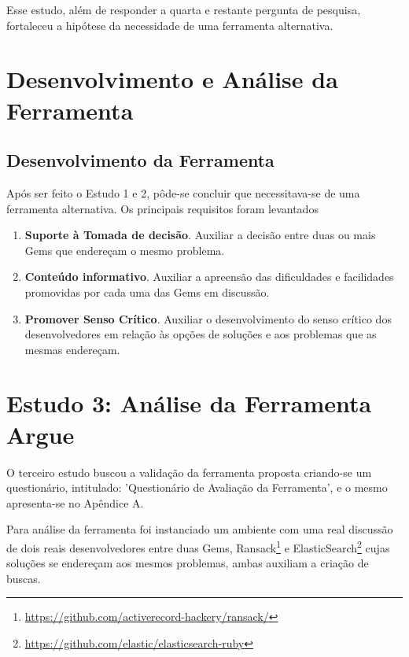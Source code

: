 Esse estudo, além de responder a quarta e restante pergunta de pesquisa, fortaleceu a hipótese da necessidade de uma ferramenta alternativa.

\section{Desenvolvimento e Análise da Ferramenta}

\subsection{Desenvolvimento da Ferramenta}

Após ser feito o Estudo 1 e 2, pôde-se concluir que necessitava-se de uma ferramenta alternativa. Os principais requisitos foram levantados

\begin{enumerate}

  \item \textbf{Suporte à Tomada de decisão}. Auxiliar a decisão entre duas ou mais Gems que endereçam o mesmo problema.
  
  \item \textbf{Conteúdo informativo}. Auxiliar a apreensão das dificuldades e facilidades promovidas por cada uma das Gems em discussão.
  
  \item \textbf{Promover Senso Crítico}. Auxiliar o desenvolvimento do senso crítico dos desenvolvedores em relação às opções de soluções e aos problemas que as mesmas endereçam.
  
\end{enumerate}

\section{Estudo 3: Análise da Ferramenta Argue}

O terceiro estudo buscou a validação da ferramenta proposta criando-se um questionário, intitulado: 'Questionário de Avaliação da Ferramenta', e o mesmo apresenta-se no Apêndice A.

Para análise da ferramenta foi instanciado um ambiente com uma real discussão de dois reais desenvolvedores entre duas Gems, Ransack\footnote{\url{https://github.com/activerecord-hackery/ransack/}} e ElasticSearch\footnote{\url{https://github.com/elastic/elasticsearch-ruby}} cujas soluções se endereçam aos mesmos problemas, ambas auxiliam a criação de buscas.

